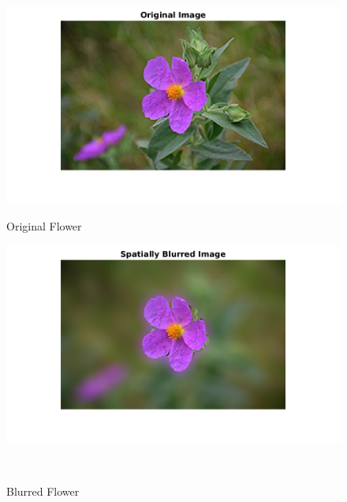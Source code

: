 \documentclass[12pt, a4paper]{article}
\begin{document}
\begin{figure}[h!]
    \centering
    \renewcommand{\thefigure}{3.6(a)}
    \begin{minipage}[c][1\width]{0.45\textwidth}
    	\hspace*{-0.5in}
    	\includegraphics[width=1.24\textwidth]{flower_original.png}
    	\null\vspace*{-28pt}
    	\caption{Original Flower}
	    \label{fig:3.6(a)}
    \end{minipage}
    \renewcommand{\thefigure}{3.6(b)}
    \begin{minipage}[c][1\width]{0.45\textwidth}
    	\includegraphics[width=1.24\textwidth]{flower_spatially_blurred.png}
    	\null\vspace*{-28pt}
    	\caption{Blurred Flower}
	    \label{fig:3.6(b)}
    \end{minipage} \\
    \renewcommand{\thefigure}{3.7(a)}
    \begin{minipage}[c][1\width]{0.45\textwidth}
    	\hspace*{-0.5in}

\end{minipage}
\end{figure}
\end{document}
